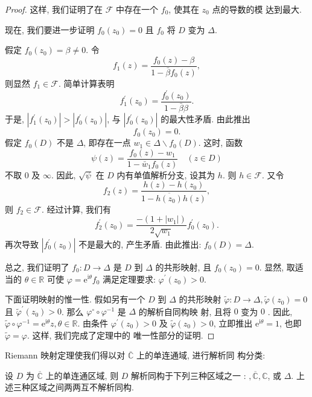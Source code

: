 \begin{proof}
这样, 我们证明了在 $\mathscr{F}$ 中存在一个 $f_0$, 使其在 $z_0$ 点的导数的模 达到最大.

现在, 我们要进一步证明 $f_0\left(z_0\right)=0$ 且 $f_0$ 将 $D$ 变为 $\Delta$. 

假定 $f_0\left(z_0\right)=\beta \neq 0$. 令
$$
f_1(z)=\frac{f_0(z)-\beta}{1-\bar{\beta} f_0(z)},
$$
则显然 $f_1 \in \mathscr{F}$. 简单计算表明
$$
f_1^{\prime}\left(z_0\right)=\frac{f_0^{\prime}\left(z_0\right)}{1-\bar{\beta} \beta} .
$$
于是, $\left|f_1^{\prime}\left(z_0\right)\right|>\left|f_0^{\prime}\left(z_0\right)\right|$, 与 $\left|f_0^{\prime}\left(z_0\right)\right|$ 的最大性矛盾. 由此推出
$$
f_0\left(z_0\right)=0 .
$$
假定 $f_0(D)$ 不是 $\Delta$, 即存在一点 $w_1 \in \Delta \backslash f_0(D)$. 这时, 函数
$$
\psi(z)=\frac{f_0(z)-w_1}{1-\bar{w}_1 f_0(z)} \quad(z \in D)
$$
不取 0 及 $\infty$. 因此, $\sqrt{\psi}$ 在 $D$ 内有单值解析分支, 设其为 $h$. 则 $h \in\mathscr{F}$.
又令
$$
f_2(z)=\frac{h(z)-h\left(z_0\right)}{1-\overline{h\left(z_0\right)} h(z)},
$$
则 $f_2 \in \mathscr{F}$. 经过计算, 我们有
$$
f_2^{\prime}\left(z_0\right)=\frac{-\left(1+\left|w_1\right|\right)}{2 \sqrt{w_1}} f_0^{\prime}\left(z_0\right) .
$$
再次导致 $\left|f_0^{\prime}\left(z_0\right)\right|$ 不是最大的, 产生矛盾. 由此推出: $f_0(D)=\Delta$.

总之, 我们证明了 $f_0: D \rightarrow \Delta$ 是 $D$ 到 $\Delta$ 的共形映射, 且 $f_0\left(z_0\right)=0$. 显然, 取适当的 $\theta \in \mathbb{R}$ 可使 $\varphi=\mathrm{e}^{\mathrm{i} \theta} f_0$ 满足定理要求: $\varphi^{\prime}\left(z_0\right)>0$. 

下面证明映射的惟一性. 假如另有一个 $D$ 到 $\Delta$ 的共形映射 $\tilde{\varphi}: D \rightarrow \Delta, \tilde{\varphi}\left(z_0\right)=0$ 且 $\tilde{\varphi}^{\prime}\left(z_0\right)>0$. 那么 $\varphi^{\circ} \circ \varphi^{-1}$ 是 $\Delta$ 的解析自同构映
射, 且将 $0$ 变为 $0$ . 因此, $\tilde{\varphi} \circ \varphi^{-1}=\mathrm{e}^{\mathrm{i} \theta} z, \theta \in \mathbb{R}$. 由条件 $\varphi^{\prime}\left(z_0\right)>0$ 及 $\tilde{\varphi}\left(z_0\right)>0$, 立即推出 $\mathrm{e}^{\mathrm{i} \theta}=1$, 也即 $\tilde{\varphi}=\varphi$. 这样, 我们完成了定理中的 唯一性部分的证明.
\end{proof}
Riemann 映射定理使我们得以对 $\overline{\mathbb{C}}$ 上的单连通域, 进行解析同 构分类:
\begin{thm}
    设 $D$ 为 $\overline{\mathbb{C}}$ 上的单连通区域, 则 $D$ 解析同构于下列三种区域之一 : $,\overline{\mathbb{C}}, \mathbb{C}$, 或 $\Delta$. 上述三种区域之间两两互不解析同构.
\end{thm}
